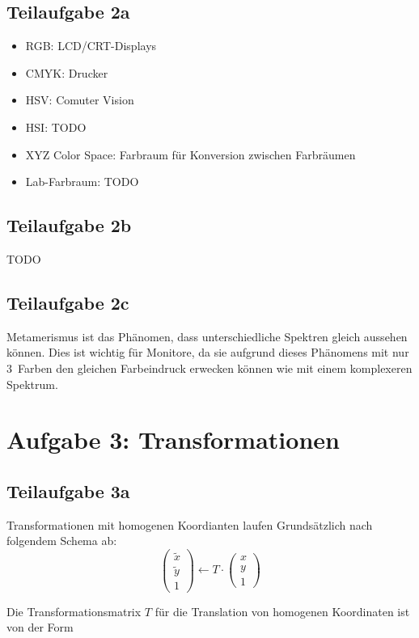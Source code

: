 \documentclass[a4paper]{scrartcl}
\begin{document}
\subsection*{Teilaufgabe 2a}

\begin{itemize}
    \item RGB: LCD/CRT-Displays
    \item CMYK: Drucker
    \item HSV: Comuter Vision
    \item HSI: TODO
    \item XYZ Color Space: Farbraum für Konversion zwischen Farbräumen
    \item Lab-Farbraum: TODO
\end{itemize}

\subsection*{Teilaufgabe 2b}
TODO

\subsection*{Teilaufgabe 2c}
Metamerismus ist das Phänomen, dass unterschiedliche Spektren gleich aussehen
können. Dies ist wichtig für Monitore, da sie aufgrund dieses Phänomens mit nur
3~Farben den gleichen Farbeindruck erwecken können wie mit einem komplexeren
Spektrum.

\section*{Aufgabe 3: Transformationen}
\subsection*{Teilaufgabe 3a}
Transformationen mit homogenen Koordianten laufen Grundsätzlich nach folgendem Schema ab:
\[\begin{pmatrix}\tilde{x}\\ \tilde{y} \\ 1\end{pmatrix} \gets T \cdot \begin{pmatrix}x\\ y \\ 1\end{pmatrix}\]

Die Transformationsmatrix $T$ für die Translation von homogenen Koordinaten ist von der Form
\end{document}
